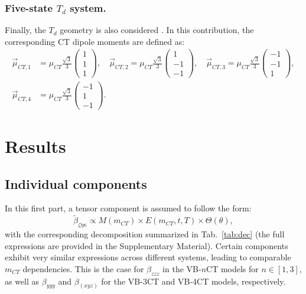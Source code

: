 \documentclass[USenglish]{article}
\begin{document}
\subsubsection{Five-state $T_d$ system.}  
Finally, the $T_d$ geometry is also considered \cite{choNonlinearOpticalProperties2002}. In this contribution, the corresponding CT dipole moments are defined as:  
\begin{align*}
	\vec{\mu}_{CT,1} &= \mu_{CT} \frac{\sqrt{3}}{3} \begin{pmatrix} 1 \\ 1 \\ 1 \end{pmatrix},  
	\quad  
	\vec{\mu}_{CT,2} = \mu_{CT} \frac{\sqrt{3}}{3} \begin{pmatrix} 1 \\ -1 \\ -1 \end{pmatrix}, 
	\quad
	 \vec{\mu}_{CT,3} = \mu_{CT} \frac{\sqrt{3}}{3} \begin{pmatrix} -1 \\ -1 \\ 1 \end{pmatrix},  \\
	\vec{\mu}_{CT,4} &= \mu_{CT} \frac{\sqrt{3}}{3} \begin{pmatrix} -1 \\ 1 \\ -1 \end{pmatrix}.
\end{align*}

\section{Results}

\subsection{Individual components}

In this first part, a tensor component is assumed to follow the form:
\begin{equation*}
	\tilde \beta_{\zeta\eta\kappa} \propto M(m_{CT}) \times E(m_{CT},t,T) \times \Theta(\theta),
\end{equation*}
with the corresponding decomposition summarized in Tab.~\ref{tab:dec} (the full expressions are provided in the Supplementary Material).
Certain components exhibit very similar expressions across different systems, leading to comparable $m_{CT}$ dependencies. This is the case for $\beta_{zzz}$ in the VB-$n$CT models for $n\in[1,3]$, as well as $\beta_{yyy}$ and $\beta_{(xyz)}$ for the VB-3CT and VB-4CT models, respectively. 
\end{document}
